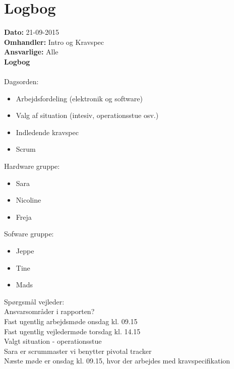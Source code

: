 \section{Logbog}

\textbf{Dato:} 21-09-2015\\
\textbf{Omhandler:} Intro og Kravspec\\
\textbf{Ansvarlige:} Alle\\

\textbf{Logbog}
\\
\\
Dagsorden:
\begin{itemize}
	\item Arbejdsfordeling (elektronik og software)
	\item Valg af situation (intesiv, operationsstue osv.)
	\item Indledende kravspec
	\item Scrum
\end{itemize}

Hardware gruppe:
\begin{itemize}
	\item Sara
	\item Nicoline
	\item Freja
\end{itemize}

Sofware gruppe:
\begin{itemize}
	\item Jeppe 
	\item Tine
	\item Mads
\end{itemize}

Spørgsmål vejleder: \\
Ansvarsområder i rapporten?\\
Fast ugentlig arbejdsmøde onsdag kl. 09.15\\
Fast ugentlig vejledermøde torsdag kl. 14.15\\

Valgt situation - operationsstue\\
Sara er scrummaster vi benytter pivotal tracker
\\
Næste møde er onsdag kl. 09.15, hvor der arbejdes med kravspecifikation\\